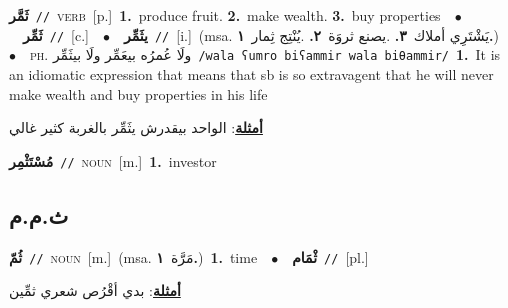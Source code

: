 \documentclass[10pt,a4paper,twoside]{article} %
\begin{document}
\begin{multicols}{2}
{\setlength\topsep{0pt}\textbf{\foreignlanguage{arabic}{ثَمَّر}}\ {\color{gray}\texttt{//}\color{black}}\ \textsc{verb}\ [p.]\ \textbf{1.}~produce fruit.  \textbf{2.}~make wealth.  \textbf{3.}~buy properties\ \ $\bullet$\ \ \setlength\topsep{0pt}\textbf{\foreignlanguage{arabic}{ثَمِّر}}\ {\color{gray}\texttt{//}\color{black}}\ [c.]\ \ $\bullet$\ \ \setlength\topsep{0pt}\textbf{\foreignlanguage{arabic}{يثَمِّر}}\ {\color{gray}\texttt{//}\color{black}}\ [i.]\ \color{gray}(msa. \foreignlanguage{arabic}{يَشْتَرِي أملاك}~\foreignlanguage{arabic}{\textbf{٣.}}  .\foreignlanguage{arabic}{يصنع ثروَة}~\foreignlanguage{arabic}{\textbf{٢.}}  .\foreignlanguage{arabic}{يُنْتِج ثِمار}~\foreignlanguage{arabic}{\textbf{١.}})\color{black}\ \ $\bullet$\ \ \textsc{ph.} \color{gray} \foreignlanguage{arabic}{ولَا عُمرُه بيعَمِّر ولَا بيثَمِّر}\color{black}\ {\color{gray}\texttt{/{\sffamily wala ʕumro biʕammir wala biθammir}/}\color{black}}\ \textbf{1.}~It is an idiomatic expression that means that sb is so extravagent that he will never make wealth and buy properties in his life\  \begin{flushright}\color{gray}\foreignlanguage{arabic}{\textbf{\underline{\foreignlanguage{arabic}{أمثلة}}}: الواحد بيقدرش يثَمِّر بالغربة كثير غالي}\end{flushright}\color{black}} \vspace{2mm}

{\setlength\topsep{0pt}\textbf{\foreignlanguage{arabic}{مُسْتَثْمِر}}\ {\color{gray}\texttt{//}\color{black}}\ \textsc{noun}\ [m.]\ \textbf{1.}~investor\ } \vspace{2mm}

\vspace{-3mm}
\subsection*{\color{blue}\foreignlanguage{arabic}{ث.م.م}\color{blue}{}} 

{\setlength\topsep{0pt}\textbf{\foreignlanguage{arabic}{ثُمّ}}\ {\color{gray}\texttt{//}\color{black}}\ \textsc{noun}\ [m.]\ \color{gray}(msa. \foreignlanguage{arabic}{مَرَّة}~\foreignlanguage{arabic}{\textbf{١.}})\color{black}\ \textbf{1.}~time\ \ $\bullet$\ \ \setlength\topsep{0pt}\textbf{\foreignlanguage{arabic}{ثْمَام}}\ {\color{gray}\texttt{//}\color{black}}\ [pl.]\  \begin{flushright}\color{gray}\foreignlanguage{arabic}{\textbf{\underline{\foreignlanguage{arabic}{أمثلة}}}: بدي أقْرُص شعري ثمِّين}\end{flushright}\color{black}} \vspace{2mm}


\end{multicols}
\end{document}
